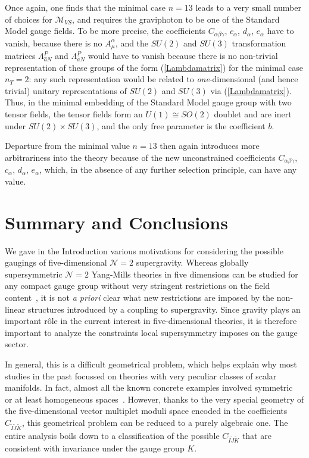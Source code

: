\documentclass[a4paper,11pt]{article}
\newcommand{\ti}{\ensuremath{\tilde{I}}}
\newcommand{\tj}{\ensuremath{\tilde{J}}}
\newcommand{\tk}{\ensuremath{\tilde{K}}}
\newcommand{\M}{\ensuremath{\mathcal{M}}}
\begin{document}
Once again, one finds that the minimal case $n=13$ leads to a very small 
number of choices for $\M_{VS}$, and requires the graviphoton to be 
one of the Standard Model gauge fields. To be more precise, the 
coefficients $C_{\alpha\beta\gamma}$, 
$c_{\alpha}$, $d_{\alpha}$, $e_{\alpha}$ have to vanish, because there is no 
$A_{\mu}^{\alpha}$, and the $SU(2)$ and $SU(3)$ transformation matrices
$\Lambda_{\hat{a}N}^{P}$ and $\Lambda_{\bar{a}N}^{P}$ would have to vanish
because there is no non-trivial representation of these groups of the form 
(\ref{Lambdamatrix}) for the minimal case $n_T=2$: any such representation
would  be related to \emph{one}-dimensional (and hence trivial) 
unitary representations of $SU(2)$ and $SU(3)$
via (\ref{Lambdamatrix}).
Thus, in the minimal 
embedding of the Standard Model gauge group with two tensor fields,
the tensor fields form an $U(1)\cong SO(2)$ doublet and are inert under 
$SU(2)\times SU(3)$, and the only free parameter is the coefficient $b$.

Departure from the minimal
value $n=13$ then again introduces more arbitrariness into the theory 
because of the new unconstrained coefficients $C_{\alpha\beta\gamma}$, 
$c_{\alpha}$, $d_{\alpha}$, $e_{\alpha}$, which, in the absence of any 
further selection principle, can have any value.






\section{Summary and Conclusions}

We gave in the Introduction various motivations for considering the
possible gaugings of five-dimensional $\mathcal{N}=2$ supergravity. 
Whereas globally supersymmetric $\mathcal{N}=2$ Yang-Mills theories in
five dimensions can be studied for any compact gauge group without very
stringent restrictions on the field content~\cite{5Dfieldtheory}, it is
not {\it a priori} clear what new restrictions are imposed by the
non-linear structures introduced by a coupling to supergravity. Since
gravity plays an important r\^{o}le in the current interest in
five-dimensional theories, it is therefore important to analyze the
constraints local supersymmetry imposes on the gauge sector.

In general, this is a difficult geometrical problem, which helps explain
why most studies in the past focussed on theories with very peculiar
classes of scalar manifolds. In fact, almost all the known concrete
examples involved symmetric~\cite{GST1,GST2,GST3,dWvP1,GZ1} or at least
homogeneous spaces~\cite{dWvP2,GZ1}. However, thanks to the very special
geometry of the five-dimensional vector multiplet moduli space encoded in
the coefficients $C_{\ti\tj\tk}$, this geometrical problem can be reduced
to a purely algebraic one.  The entire analysis boils down to a
classification of the possible $C_{\ti\tj\tk}$ that are consistent with
invariance under the  gauge group $K$. 
\end{document}
